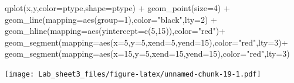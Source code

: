 \documentclass[
]{article}
\newenvironment{Shaded}{\begin{snugshade}}{\end{snugshade}}
\newcommand{\AttributeTok}[1]{\textcolor[rgb]{0.77,0.63,0.00}{#1}}
\newcommand{\DecValTok}[1]{\textcolor[rgb]{0.00,0.00,0.81}{#1}}
\newcommand{\FunctionTok}[1]{\textcolor[rgb]{0.00,0.00,0.00}{#1}}
\newcommand{\NormalTok}[1]{#1}
\newcommand{\SpecialCharTok}[1]{\textcolor[rgb]{0.00,0.00,0.00}{#1}}
\newcommand{\StringTok}[1]{\textcolor[rgb]{0.31,0.60,0.02}{#1}}
\theoremstyle{remark}
\begin{document}
\begin{Shaded}
\begin{Highlighting}[]
\FunctionTok{qplot}\NormalTok{(x,y,}\AttributeTok{color=}\NormalTok{ptype,}\AttributeTok{shape=}\NormalTok{ptype) }\SpecialCharTok{+} \FunctionTok{geom\_point}\NormalTok{(}\AttributeTok{size=}\DecValTok{4}\NormalTok{) }\SpecialCharTok{+}
\FunctionTok{geom\_line}\NormalTok{(}\AttributeTok{mapping=}\FunctionTok{aes}\NormalTok{(}\AttributeTok{group=}\DecValTok{1}\NormalTok{),}\AttributeTok{color=}\StringTok{"black"}\NormalTok{,}\AttributeTok{lty=}\DecValTok{2}\NormalTok{) }\SpecialCharTok{+}
\FunctionTok{geom\_hline}\NormalTok{(}\AttributeTok{mapping=}\FunctionTok{aes}\NormalTok{(}\AttributeTok{yintercept=}\FunctionTok{c}\NormalTok{(}\DecValTok{5}\NormalTok{,}\DecValTok{15}\NormalTok{)),}\AttributeTok{color=}\StringTok{"red"}\NormalTok{)}\SpecialCharTok{+}
\FunctionTok{geom\_segment}\NormalTok{(}\AttributeTok{mapping=}\FunctionTok{aes}\NormalTok{(}\AttributeTok{x=}\DecValTok{5}\NormalTok{,}\AttributeTok{y=}\DecValTok{5}\NormalTok{,}\AttributeTok{xend=}\DecValTok{5}\NormalTok{,}\AttributeTok{yend=}\DecValTok{15}\NormalTok{),}\AttributeTok{color=}\StringTok{"red"}\NormalTok{,}\AttributeTok{lty=}\DecValTok{3}\NormalTok{)}\SpecialCharTok{+}
\FunctionTok{geom\_segment}\NormalTok{(}\AttributeTok{mapping=}\FunctionTok{aes}\NormalTok{(}\AttributeTok{x=}\DecValTok{15}\NormalTok{,}\AttributeTok{y=}\DecValTok{5}\NormalTok{,}\AttributeTok{xend=}\DecValTok{15}\NormalTok{,}\AttributeTok{yend=}\DecValTok{15}\NormalTok{),}\AttributeTok{color=}\StringTok{"red"}\NormalTok{,}\AttributeTok{lty=}\DecValTok{3}\NormalTok{)}
\end{Highlighting}
\end{Shaded}

\texttt{[image: Lab\_sheet3\_files/figure-latex/unnamed-chunk-19-1.pdf]}
\end{document}
